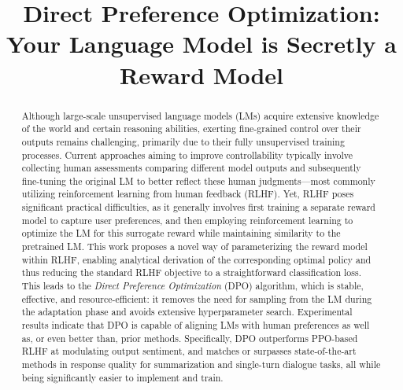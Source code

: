 \title{Direct Preference Optimization: Your Language Model is Secretly a Reward Model}

\begin{abstract}
Although large-scale unsupervised language models (LMs) acquire extensive knowledge of the world and certain reasoning abilities, exerting fine-grained control over their outputs remains challenging, primarily due to their fully unsupervised training processes. Current approaches aiming to improve controllability typically involve collecting human assessments comparing different model outputs and subsequently fine-tuning the original LM to better reflect these human judgments—most commonly utilizing reinforcement learning from human feedback (RLHF). Yet, RLHF poses significant practical difficulties, as it generally involves first training a separate reward model to capture user preferences, and then employing reinforcement learning to optimize the LM for this surrogate reward while maintaining similarity to the pretrained LM. This work proposes a novel way of parameterizing the reward model within RLHF, enabling analytical derivation of the corresponding optimal policy and thus reducing the standard RLHF objective to a straightforward classification loss. This leads to the \textit{Direct Preference Optimization} (DPO) algorithm, which is stable, effective, and resource-efficient: it removes the need for sampling from the LM during the adaptation phase and avoids extensive hyperparameter search. Experimental results indicate that DPO is capable of aligning LMs with human preferences as well as, or even better than, prior methods. Specifically, DPO outperforms PPO-based RLHF at modulating output sentiment, and matches or surpasses state-of-the-art methods in response quality for summarization and single-turn dialogue tasks, all while being significantly easier to implement and train.
\end{abstract}

